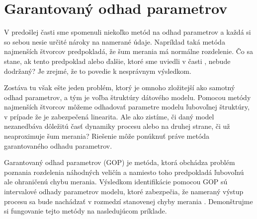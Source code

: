 \chapter{Garantovaný odhad parametrov}
V predošlej časti sme spomenuli niekoľko metód na odhad parametrov a každá si so sebou nesie určité nároky na namerané údaje. Napríklad taká metóda najmenších štvorcov predpokladá, že šum merania má normálne rozdelenie. Čo sa stane, ak tento predpoklad alebo ďalšie, ktoré sme uviedli v časti , nebude dodržaný? Je zrejmé, že to povedie k nesprávnym výsledkom. 

Zostáva tu však ešte jeden problém, ktorý je omnoho zložitejší ako samotný odhad parametrov, a tým je voľba štruktúry dátového modelu. Pomocou metódy najmenších štvorcov môžeme odhadovať parametre modelu ľubovoľnej štruktúry, v prípade že je zabezpečená linearita. Ale ako zistíme, či daný model nezanedbáva dôležitú časť dynamiky procesu alebo na druhej strane, či už neaproximuje šum merania? Riešenie môže ponúknuť práve metóda garantovaného odhadu parametrov.

Garantovaný odhad parametrov (GOP) je metóda, ktorá obchádza problém poznania rozdelenia náhodných veličín a namiesto toho predpokladá ľubovoľnú ale ohraničenú chybu merania. Výsledkom identifikácie pomocou GOP sú intervalové odhady parametrov modelu, ktoré zabezpečia, že nameraný výstup procesu sa bude nachádzať v rozmedzí stanovenej chyby merania \cite{paulen:gpe:2017}. Demonštrujme si fungovanie tejto metódy na nasledujúcom príklade.

